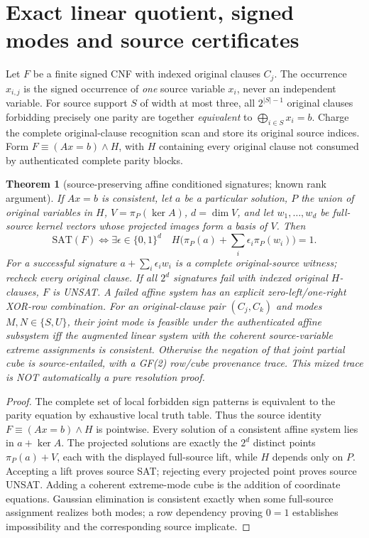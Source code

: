 \documentclass[11pt]{article}
\newtheorem{theorem}{Theorem}
\begin{document}
\section{Exact linear quotient, signed modes and source certificates}
Let $F$ be a finite signed CNF with indexed original clauses $C_j$. The occurrence $x_{i,j}$ is the signed occurrence of \emph{one} source variable $x_i$, never an independent variable. For source support $S$ of width at most three, all $2^{|S|-1}$ original clauses forbidding precisely one parity are together \emph{equivalent} to $\bigoplus_{i\in S}x_i=b$. Charge the complete original-clause recognition scan and store its original source indices. Form $F\equiv (Ax=b)\land H$, with $H$ containing every original clause not consumed by authenticated complete parity blocks.
\begin{theorem}[source-preserving affine conditioned signatures; known rank argument]
If $Ax=b$ is consistent, let $a$ be a particular solution, $P$ the union of original variables in $H$, $V=\pi_P(\ker A)$, $d=\dim V$, and let $w_1,\ldots,w_d$ be full-source kernel vectors whose projected images form a basis of $V$. Then
\[
 \mathrm{SAT}(F)\iff \exists\epsilon\in\{0,1\}^d\quad
 H\bigl(\pi_P(a)+\textstyle\sum_i\epsilon_i\pi_P(w_i)\bigr)=1.
\]
For a successful signature $a+\sum_i\epsilon_iw_i$ is a complete original-source witness; recheck every original clause. If all $2^d$ signatures fail with indexed original $H$-clauses, $F$ is UNSAT. A failed affine system has an explicit zero-left/one-right XOR-row combination. For an original-clause pair $(C_j,C_k)$ and modes $M,N\in\{S,U\}$, their joint mode is feasible under the authenticated affine subsystem iff the augmented linear system with the coherent source-variable extreme assignments is consistent. Otherwise the negation of that joint partial cube is source-entailed, with a GF(2) row/cube provenance trace. This mixed trace is NOT automatically a pure resolution proof.
\end{theorem}
\begin{proof}
The complete set of local forbidden sign patterns is equivalent to the parity equation by exhaustive local truth table. Thus the source identity $F\equiv(Ax=b)\land H$ is pointwise. Every solution of a consistent affine system lies in $a+\ker A$. The projected solutions are exactly the $2^d$ distinct points $\pi_P(a)+V$, each with the displayed full-source lift, while $H$ depends only on $P$. Accepting a lift proves source SAT; rejecting every projected point proves source UNSAT. Adding a coherent extreme-mode cube is the addition of coordinate equations. Gaussian elimination is consistent exactly when some full-source assignment realizes both modes; a row dependency proving $0=1$ establishes impossibility and the corresponding source implicate.
\end{proof}
\end{document}
